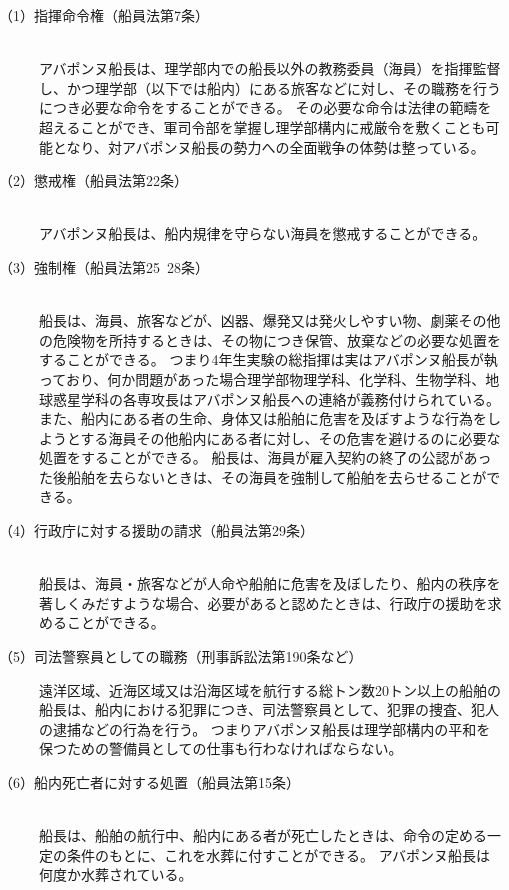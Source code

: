 \begin{description}
\item[（1）指揮命令権（船員法第7条）]\mbox{}\\
アバポンヌ船長は、理学部内での船長以外の教務委員（海員）を指揮監督し、かつ理学部（以下では船内）にある旅客などに対し、その職務を行うにつき必要な命令をすることができる。
その必要な命令は法律の範疇を超えることができ、軍司令部を掌握し理学部構内に戒厳令を敷くことも可能となり、対アバポンヌ船長の勢力への全面戦争の体勢は整っている。

\item[（2）懲戒権（船員法第22条）]\mbox{}\\
アバポンヌ船長は、船内規律を守らない海員を懲戒することができる。

\item[（3）強制権（船員法第25~28条）]\mbox{}\\
船長は、海員、旅客などが、凶器、爆発又は発火しやすい物、劇薬その他の危険物を所持するときは、その物につき保管、放棄などの必要な処置をすることができる。
つまり4年生実験の総指揮は実はアバポンヌ船長が執っており、何か問題があった場合理学部物理学科、化学科、生物学科、地球惑星学科の各専攻長はアバポンヌ船長への連絡が義務付けられている。
また、船内にある者の生命、身体又は船舶に危害を及ぼすような行為をしようとする海員その他船内にある者に対し、その危害を避けるのに必要な処置をすることができる。
船長は、海員が雇入契約の終了の公認があった後船舶を去らないときは、その海員を強制して船舶を去らせることができる。

\item[（4）行政庁に対する援助の請求（船員法第29条）]\mbox{}\\
船長は、海員・旅客などが人命や船舶に危害を及ぼしたり、船内の秩序を著しくみだすような場合、必要があると認めたときは、行政庁の援助を求めることができる。

\item[（5）司法警察員としての職務（刑事訴訟法第190条など）]\mbox{}
遠洋区域、近海区域又は沿海区域を航行する総トン数20トン以上の船舶の船長は、船内における犯罪につき、司法警察員として、犯罪の捜査、犯人の逮捕などの行為を行う。
つまりアバポンヌ船長は理学部構内の平和を保つための警備員としての仕事も行わなければならない。

\item[（6）船内死亡者に対する処置（船員法第15条）]\mbox{}\\
船長は、船舶の航行中、船内にある者が死亡したときは、命令の定める一定の条件のもとに、これを水葬に付すことができる。
アバポンヌ船長は何度か水葬されている。
\end{description}

